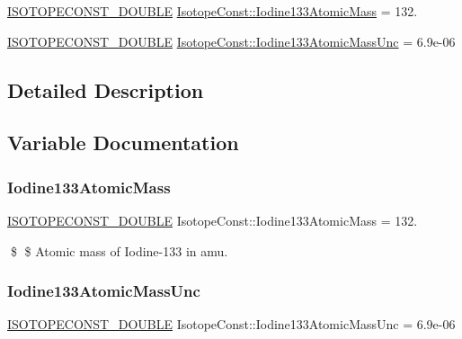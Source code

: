 \begin{DoxyCompactItemize}
\item 
\mbox{\hyperlink{group___isotope_const-_macros_ga8f45a7272ce02c0b4c65c44636ed719a}{I\+S\+O\+T\+O\+P\+E\+C\+O\+N\+S\+T\+\_\+\+D\+O\+U\+B\+LE}} \mbox{\hyperlink{group___isotope_const-_iodine-_i133_ga10f95951719b6fc137794e413aef382a}{Isotope\+Const\+::\+Iodine133\+Atomic\+Mass}} = 132.
\item 
\mbox{\hyperlink{group___isotope_const-_macros_ga8f45a7272ce02c0b4c65c44636ed719a}{I\+S\+O\+T\+O\+P\+E\+C\+O\+N\+S\+T\+\_\+\+D\+O\+U\+B\+LE}} \mbox{\hyperlink{group___isotope_const-_iodine-_i133_ga5cf00115e618e23c2977de23becfa1de}{Isotope\+Const\+::\+Iodine133\+Atomic\+Mass\+Unc}} = 6.\+9e-\/06
\end{DoxyCompactItemize}


\subsection{Detailed Description}


\subsection{Variable Documentation}
\mbox{\label{group___isotope_const-_iodine-_i133_ga10f95951719b6fc137794e413aef382a}} 
\subsubsection{\texorpdfstring{Iodine133\+Atomic\+Mass}{Iodine133AtomicMass}}
{\footnotesize\ttfamily \mbox{\hyperlink{group___isotope_const-_macros_ga8f45a7272ce02c0b4c65c44636ed719a}{I\+S\+O\+T\+O\+P\+E\+C\+O\+N\+S\+T\+\_\+\+D\+O\+U\+B\+LE}} Isotope\+Const\+::\+Iodine133\+Atomic\+Mass = 132.}

\$ \$ Atomic mass of Iodine-\/133 in amu. \mbox{\label{group___isotope_const-_iodine-_i133_ga5cf00115e618e23c2977de23becfa1de}} 
\subsubsection{\texorpdfstring{Iodine133\+Atomic\+Mass\+Unc}{Iodine133AtomicMassUnc}}
{\footnotesize\ttfamily \mbox{\hyperlink{group___isotope_const-_macros_ga8f45a7272ce02c0b4c65c44636ed719a}{I\+S\+O\+T\+O\+P\+E\+C\+O\+N\+S\+T\+\_\+\+D\+O\+U\+B\+LE}} Isotope\+Const\+::\+Iodine133\+Atomic\+Mass\+Unc = 6.\+9e-\/06}

